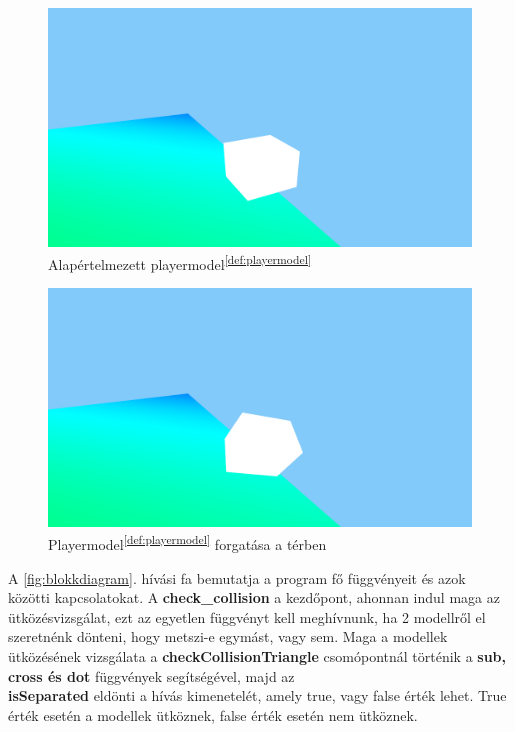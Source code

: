 \newpage

\begin{figure}[h]
	\centering
	\includegraphics[width=13truecm, height=7truecm]{images/modell_4.3.2.1.png}
	\caption{Alapértelmezett playermodel\textsuperscript{\ref{def:playermodel}}}
	\label{fig:forgatas_1}
\end{figure}
\begin{figure}[h]
	\centering
	\includegraphics[width=13truecm, height=7truecm]{images/modell_4.3.2.3.png}
	\caption{Playermodel\textsuperscript{\ref{def:playermodel}} forgatása a térben}
	\label{fig:forgatas_2}
\end{figure}

\newpage
{}

A \ref{fig:blokkdiagram}. hívási fa bemutatja a program fő függvényeit és azok közötti kapcsolatokat. A \textbf{check\_collision} a kezdőpont, ahonnan indul maga az ütközésvizsgálat, ezt az egyetlen függvényt kell meghívnunk, ha 2 modellről el szeretnénk dönteni, hogy metszi-e egymást, vagy sem. Maga a modellek ütközésének vizsgálata a \textbf{checkCollisionTriangle} csomópontnál történik a \textbf{sub, cross és dot} függvények segítségével, majd az \\\textbf{isSeparated} eldönti a hívás kimenetelét, amely true, vagy false érték lehet. True érték esetén a modellek ütköznek, false érték esetén nem ütköznek.


